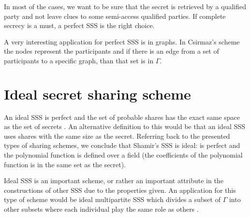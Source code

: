\documentclass[12pt, a4paper, oneside]{book}
\begin{document}
    In most of the cases, we want to be sure that the secret is retrieved by a qualified party and not leave clues to some semi-access qualified parties. If complete secrecy is a must, a perfect SSS is the right choice.
    
    A very interesting  application for perfect SSS is in graphs. In Csirmaz's scheme \cite{PerfectGraph} the nodes represent the participants and if there is an edge from a set of participants to a specific graph, than that set is in $ \Gamma $.
    \section{Ideal secret sharing scheme}
    An ideal SSS is perfect and the set of probable shares has the exact same space as the set of secrets \cite{IdealSSS}. An alternative definition to this would be that an ideal SSS uses shares with the same size as the secret. Referring back to the presented types of sharing schemes, we conclude that Shamir's \cite{ShareASecret} SSS is ideal: is perfect and the polynomial function is defined over a field (the coefficients of the polynomial function is in the same set as the secret).
    
    Ideal SSS is an important scheme, or rather an important attribute in the constructions of other SSS due to the properties given. An application for this type of scheme would be ideal multipartite SSS which divides a subset of $ \Gamma $ into other subsets where each individual play the same role as others \cite{IdealMultipartite}.
\end{document}
